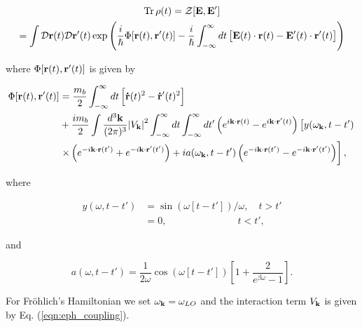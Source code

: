 \begin{equation}
    \begin{gathered}
    \Tr \rho(t) = \mathcal{Z}[\vb{E}, \vb{E'}] \\ = \int \mathcal{D}\vb{r}(t) \mathcal{D}\vb{r'}(t) \exp\left( \frac{i}{\hslash} \Phi[\vb{r}(t), \vb{r'}(t)] - \frac{i}{\hslash} \int^{\infty}_{-\infty} dt \left[ \vb{E}(t) \cdot \vb{r}(t) - \vb{E'}(t) \cdot \vb{r'}(t) \right] \right)
    \end{gathered}
\end{equation}

where $ \Phi[\vb{r}(t), \vb{r'}(t)]$ is given by

\begin{equation}\label{eqn:fhip_model_term}
    \begin{aligned}
    \Phi[\vb{r}(t), \vb{r'}(t)] &= \frac{m_b}{2} \int^{\infty}_{-\infty} dt  \left[ \vb{\dot{r}}(t)^2 - \vb{\dot{r}'}(t)^2 \right] \\
    &+ \frac{im_b}{2} \int \frac{d^3\vb{k}}{(2\pi)^3} \abs{V_{\vb{k}}}^2 \int^{\infty}_{-\infty} dt \int^{\infty}_{-\infty} dt'  \left(e^{i\vb{k}\cdot \vb{r}(t)} -  e^{i\vb{k}\cdot \vb{r'}(t)}\right)\left[ y(\omega_{\vb{k}}, t - t') \right. \\
    &\left. \times \left( e^{-i\vb{k}\cdot \vb{r}(t')} + e^{-i\vb{k}\cdot \vb{r'}(t')}\right) + ia(\omega_{\vb{k}}, t - t') \left( e^{-i\vb{k}\cdot \vb{r}(t')} - e^{-i\vb{k}\cdot \vb{r'}(t')}\right) \right],
    \end{aligned}
\end{equation}

where

\begin{equation}
    \begin{aligned}
        y(\omega, t - t') &= \sin(\omega [t - t']) / \omega, \quad t > t' \\
        &= 0, \qquad\qquad\qquad\quad\ t < t',
    \end{aligned}
\end{equation}

and 

\begin{equation}
    a(\omega, t - t') = \frac{1}{2\omega} \cos(\omega[t-t']) \left[1 + \frac{2}{e^{\beta \omega} - 1}\right].
\end{equation}

For Fr\"ohlich's Hamiltonian we set $\omega_{\vb{k}} = \omega_{LO}$ and the interaction term $V_{\vb{k}}$ is given by Eq. (\ref{eqn:eph_coupling}). 

